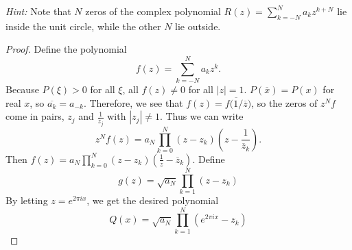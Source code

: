 \documentclass[a4paper]{article}
\begin{document}
\begin{enumerate}
{\it{Hint:}}  Note that $N$ zeros of the complex polynomial   $\displaystyle{ R(z) = \sum_{k=-N}^N a_k z^{k+N} }$ lie inside the unit circle, while the other $N$ lie outside.

\begin{proof}

  Define the polynomial
  \[ f(z) = \sum_{k=-N}^N a_k z^k .\]
  Because $P(\xi) > 0$ for all $\xi$, all $f(z) \neq 0$ for all $|z|=1$. $P(\overline{x}) = P(x)$ for real $x$, so $\overline{a_k} = a_{-k}$.
  Therefore, we see that $f(z) = \overline{f(1/ \overline{z}})$, so the zeros of $z^N f$ come
  in pairs, $z_j$ and $\frac{1}{\overline{z}_j}$ with $|z_j| \neq 1$. Thus we can write
  \[ z^N f(z) = a_N \prod_{k=0}^N (z-z_k) \left( z - \frac{1}{\overline{z}_k} \right) .\]
  Then $f(z) = a_N \prod_{k=0}^N (z-z_k) \left( \frac{1}{z} - \overline{z}_k \right)$. Define
  \[ g(z) = \sqrt{a_N} \prod_{k=1}^N (z - z_k) \]
  By letting $z = e^{2 \pi i x}$, we get the desired polynomial
  \[ Q(x) = \sqrt{a_N} \prod_{k=1}^N (e^{2 \pi i x} - z_k) \]

\end{proof}

\end{enumerate}
\end{document}
